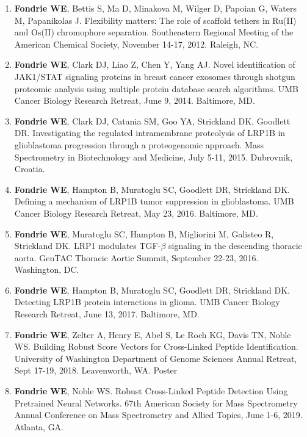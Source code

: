 \documentclass{article}
\newcommand{\mysection}[1]{\vspace{1ex}{\bf #1}}
\begin{document}
\mysection{Poster Presentations}

\begin{enumerate}
  \item {\bf Fondrie WE}, Bettis S, Ma D, Minakova M, Wilger D, Papoian G,
    Waters M, Papanikolas J. Flexibility matters: The role of scaffold tethers
    in Ru(II) and Os(II) chromophore separation. Southeastern Regional Meeting
    of the American Chemical Society, November 14-17, 2012. Raleigh, NC.

  \item {\bf Fondrie WE}, Clark DJ, Liao Z, Chen Y, Yang AJ. Novel
    identification of JAK1/STAT signaling proteins in breast cancer exosomes
    through shotgun proteomic analysis using multiple protein database search
    algorithms. UMB Cancer Biology Research Retreat, June 9, 2014. Baltimore,
    MD.

  \item {\bf Fondrie WE}, Clark DJ, Catania SM, Goo YA, Strickland DK, Goodlett
    DR. Investigating the regulated intramembrane proteolysis of LRP1B in
    glioblastoma progression through a proteogenomic approach. Mass Spectrometry
    in Biotechnology and Medicine, July 5-11, 2015. Dubrovnik, Croatia.

  \item {\bf Fondrie WE}, Hampton B, Muratoglu SC, Goodlett DR, Strickland DK.
    Defining a mechanism of LRP1B tumor suppression in glioblastoma. UMB Cancer
    Biology Research Retreat, May 23, 2016. Baltimore, MD.

  \item {\bf Fondrie WE}, Muratoglu SC, Hampton B, Migliorini M, Galisteo R,
    Strickland DK. LRP1 modulates TGF-$\beta$ signaling in the descending
    thoracic aorta. GenTAC Thoracic Aortic Summit, September 22-23, 2016.
    Washington, DC.

  \item {\bf Fondrie WE}, Hampton B, Muratoglu SC, Goodlett DR, Strickland DK.
    Detecting LRP1B protein interactions in glioma. UMB Cancer Biology Research
    Retreat, June 13, 2017. Baltimore, MD.

  \item {\bf Fondrie WE}, Zelter A, Henry E, Abel S, Le Roch KG, Davis TN, Noble
    WS. Building Robust Score Vectors for Cross-Linked Peptide Identification.
    University of Washington Department of Genome Sciences Annual Retreat, Sept
    17-19, 2018. Leavenworth, WA. Poster

  \item {\bf Fondrie WE}, Noble WS. Robust Cross-Linked Peptide Detection Using
    Pretrained Neural Networks. 67th American Society for Mass Spectrometry
    Annual Conference on Mass Spectrometry and Allied Topics, June 1-6, 2019.
    Atlanta, GA.
    
\end{enumerate}
\end{document}
